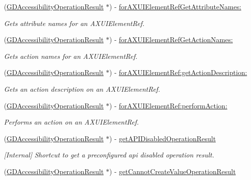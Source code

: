 \begin{DoxyCompactItemize}
(\hyperlink{interface_g_d_accessibility_operation_result}{GDAccessibilityOperationResult} $\ast$) -\/ \hyperlink{interface_g_d_accessibility_manager_a25f20499558c7b5bbd4fccca578fbefe}{forAXUIElementRefGetAttributeNames:}
\begin{DoxyCompactList}\small\item\em Gets attribute names for an AXUIElementRef. \item\end{DoxyCompactList}\item 
(\hyperlink{interface_g_d_accessibility_operation_result}{GDAccessibilityOperationResult} $\ast$) -\/ \hyperlink{interface_g_d_accessibility_manager_af7ed61beb0c1683b0e8a766ecd977547}{forAXUIElementRefGetActionNames:}
\begin{DoxyCompactList}\small\item\em Gets action names for an AXUIElementRef. \item\end{DoxyCompactList}\item 
(\hyperlink{interface_g_d_accessibility_operation_result}{GDAccessibilityOperationResult} $\ast$) -\/ \hyperlink{interface_g_d_accessibility_manager_aec013555193c1fade98e5ae3e36f953b}{forAXUIElementRef:getActionDescription:}
\begin{DoxyCompactList}\small\item\em Gets an action description on an AXUIElementRef. \item\end{DoxyCompactList}\item 
(\hyperlink{interface_g_d_accessibility_operation_result}{GDAccessibilityOperationResult} $\ast$) -\/ \hyperlink{interface_g_d_accessibility_manager_a365dbd94f222b04c86141c83c1542e68}{forAXUIElementRef:performAction:}
\begin{DoxyCompactList}\small\item\em Performs an action on an AXUIElementRef. \item\end{DoxyCompactList}\item 
\hypertarget{interface_g_d_accessibility_manager_a47b0eb8fca2a6ca2ed9352ff287956d8}{
(\hyperlink{interface_g_d_accessibility_operation_result}{GDAccessibilityOperationResult} $\ast$) -\/ \hyperlink{interface_g_d_accessibility_manager_a47b0eb8fca2a6ca2ed9352ff287956d8}{getAPIDisabledOperationResult}}
\label{interface_g_d_accessibility_manager_a47b0eb8fca2a6ca2ed9352ff287956d8}

\begin{DoxyCompactList}\small\item\em \mbox{[}Internal\mbox{]} Shortcut to get a preconfigured api disabled operation result. \item\end{DoxyCompactList}\item 
\hypertarget{interface_g_d_accessibility_manager_abee89ff43cfda7232f761f9855c7dddc}{
(\hyperlink{interface_g_d_accessibility_operation_result}{GDAccessibilityOperationResult} $\ast$) -\/ \hyperlink{interface_g_d_accessibility_manager_abee89ff43cfda7232f761f9855c7dddc}{getCannotCreateValueOperationResult}}
\label{interface_g_d_accessibility_manager_abee89ff43cfda7232f761f9855c7dddc}


\end{DoxyCompactItemize}
